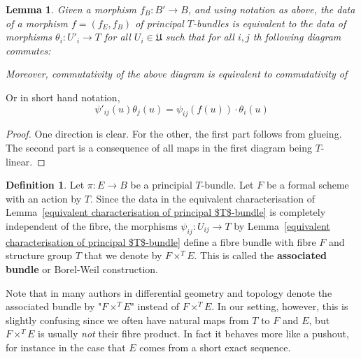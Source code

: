 \documentclass[11pt,oneside]{amsart}
\newtheorem{lemma}[theorem]{Lemma}
\theoremstyle{definition}
\newtheorem{definition}[theorem]{Definition}
\theoremstyle{remark}
\begin{document}
	\begin{lemma}\label{equivalent characterisation of morphisms of principal T-bundles}
		Given a morphism $f_B:B'\rightarrow B$, and using notation as above, the data of a morphism $f=(f_E,f_B)$ of principal $T$-bundles is equivalent to the data of morphisms $\theta_i: U'_i\rightarrow T$ for all $U_i\in \mathfrak U$ such that for all $i,j$ th following diagram commutes:
		\begin{center}
		\end{center}
		Moreover, commutativity of the above diagram is equivalent to commutativity of 
		\begin{center}
		\end{center}
	\end{lemma}
	Or in short hand notation,
	\[\psi'_{ij}(u)\theta_j(u)=\psi_{ij}(f(u))\cdot \theta_i(u)\]
	\begin{proof}
		One direction is clear. For the other, the first part follows from glueing. The second part is a consequence of all maps in the first diagram being $T$-linear.
	\end{proof}
	
	\begin{definition}\label{definition of Borel construction}
		Let $\pi:E\rightarrow B$ be a principial $T$-bundle. Let $F$ be a formal scheme with an action by $T$. Since the data in the equivalent characterisation of Lemma~\ref{equivalent characterisation of principal $T$-bundle} is completely independent of the fibre, the morphisms $\psi_{ij}:U_{ij}\rightarrow T$ by Lemma~\ref{equivalent characterisation of principal $T$-bundle} define a fibre bundle with fibre $F$ and structure group $T$ that we denote by $F\times^T E$. This is called the \textbf{associated bundle} or Borel-Weil construction.
	\end{definition}
	
	Note that in many authors in differential geometry and topology denote the associated bundle by "$F\times^T E$" instead of $F\times^T E$. In our setting, however, this is slightly confusing since we often have natural maps from $T$ to $F$ and $E$, but $F\times^T E$ is usually \textit{not} their fibre product. In fact it behaves more like a pushout, for instance in the case that $E$ comes from a short exact sequence.
	
\end{document}
